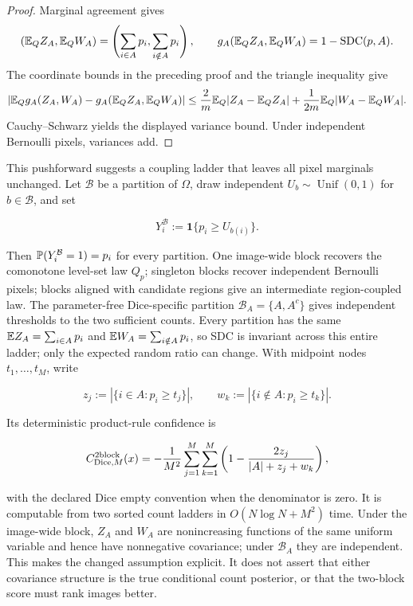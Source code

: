 \begin{proof}
Marginal agreement gives
\begin{equation*}
  (\mathbb{E}_Q Z_A,\mathbb{E}_Q W_A)
  =\left(\sum_{i\in A}p_i,\sum_{i\notin A}p_i\right),
  \qquad
  g_A(\mathbb{E}_Q Z_A,\mathbb{E}_Q W_A)=1-\operatorname{SDC}(p,A).
\end{equation*}
The coordinate bounds in the preceding proof and the triangle inequality give
\begin{equation*}
  \left|\mathbb{E}_Q g_A(Z_A,W_A)-g_A(\mathbb{E}_QZ_A,\mathbb{E}_QW_A)\right|
  \leq
  \frac{2}{m}\mathbb{E}_Q|Z_A-\mathbb{E}_QZ_A|
  +\frac{1}{2m}\mathbb{E}_Q|W_A-\mathbb{E}_QW_A|.
\end{equation*}
Cauchy--Schwarz yields the displayed variance bound. Under independent
Bernoulli pixels, variances add.
\end{proof}

This pushforward suggests a coupling ladder that leaves all pixel marginals
unchanged.  Let $\mathcal B$ be a partition of $\Omega$, draw independent
$U_b\sim\operatorname{Unif}(0,1)$ for $b\in\mathcal B$, and set

\begin{equation*}
  Y_i^{\mathcal B}:=\mathbf 1\{p_i\geq U_{b(i)}\}.
\end{equation*}

Then $\mathbb{P}(Y_i^{\mathcal B}=1)=p_i$ for every partition.  One image-wide
block recovers the comonotone level-set law $Q_p$; singleton blocks recover
independent Bernoulli pixels; blocks aligned with candidate regions give an
intermediate region-coupled law.  The parameter-free Dice-specific partition
$\mathcal B_A=\{A,A^c\}$ gives independent thresholds to the two sufficient
counts.  Every partition has the same
$\mathbb{E} Z_A=\sum_{i\in A}p_i$ and
$\mathbb{E} W_A=\sum_{i\notin A}p_i$, so SDC is invariant across this entire ladder;
only the expected random ratio can change.  With midpoint nodes
$t_1,\ldots,t_M$, write

\begin{equation*}
  z_j:=|\{i\in A:p_i\geq t_j\}|,
  \qquad
  w_k:=|\{i\notin A:p_i\geq t_k\}|.
\end{equation*}

Its deterministic product-rule confidence is

\begin{equation*}
  C^{\mathrm{2block}}_{\operatorname{Dice},M}(x)
  =-\frac{1}{M^2}\sum_{j=1}^{M}\sum_{k=1}^{M}
    \left(1-\frac{2z_j}{|A|+z_j+w_k}\right),
\end{equation*}

with the declared Dice empty convention when the denominator is zero.  It is
computable from two sorted count ladders in
$O(N\log N+M^2)$ time. Under the image-wide block, $Z_A$ and $W_A$ are
nonincreasing functions of the same uniform variable and hence have
nonnegative covariance; under $\mathcal B_A$ they are independent. This makes
the changed assumption explicit. It does not assert that either covariance
structure is the true conditional count posterior, or that the two-block score
must rank images better.

